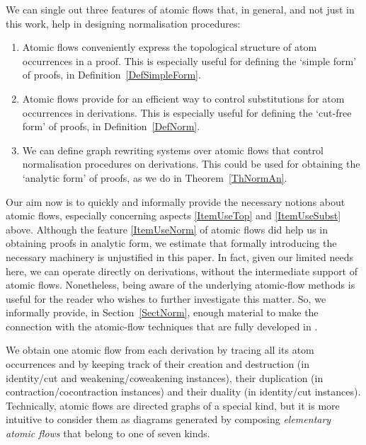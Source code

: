 \documentclass[a4paper]{amsart}
\theoremstyle{definition}
\theoremstyle{remark}
\begin{document}
We can single out three features of atomic flows that, in general, and not just in this work, help in designing normalisation procedures:

\begin{enumerate}
\item\label{ItemUseTop} Atomic flows conveniently express the topological structure of atom occurrences in a proof. This is especially useful for defining the `simple form' of proofs, in Definition~\ref{DefSimpleForm}.
\item\label{ItemUseSubst} Atomic flows provide for an efficient way to control substitutions for atom occurrences in derivations. This is especially useful for defining the `cut-free form' of proofs, in Definition~\ref{DefNorm}.
\item\label{ItemUseNorm} We can define graph rewriting systems over atomic flows that control normalisation procedures on derivations. This could be used for obtaining the `analytic form' of proofs, as we do in Theorem~\ref{ThNormAn}. 
\end{enumerate}
Our aim now is to quickly and informally provide the necessary notions about atomic flows, especially concerning aspects \eqref{ItemUseTop} and \eqref{ItemUseSubst} above. Although the feature \eqref{ItemUseNorm} of atomic flows did help us in obtaining proofs in analytic form, we estimate that formally introducing the necessary machinery is unjustified in this paper. In fact, given our limited needs here, we can operate directly on derivations, without the intermediate support of atomic flows. Nonetheless, being aware of the underlying atomic-flow methods is useful for the reader who wishes to further investigate this matter. So, we informally provide, in Section~\ref{SectNorm}, enough material to make the connection with the atomic-flow techniques that are fully developed in \cite{GuglGund:07:Normalis:lr}.

We obtain one atomic flow from each derivation by tracing all its atom occurrences and by keeping track of their creation and destruction (in identity/cut and weakening/coweakening instances), their duplication (in contraction/cocontraction instances) and their duality (in identity/cut instances). Technically, atomic flows are directed graphs of a special kind, but it is more intuitive to consider them as diagrams generated by composing \emph{elementary atomic flows} that belong to one of seven kinds.
\end{document}
